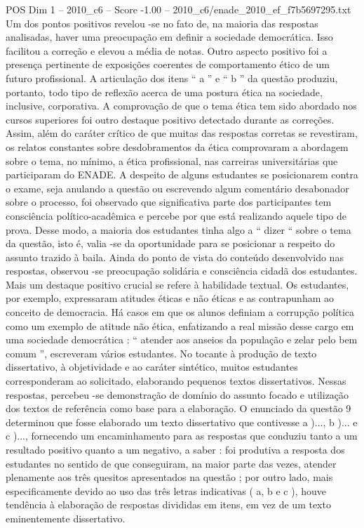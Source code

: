 \begin{textsample}{POS Dim 1 – 2010\_c6 – Score -1.00 – 2010\_c6/enade\_2010\_ef\_f7b5697295.txt}
Um dos pontos positivos revelou -se no fato de, na maioria das respostas analisadas, haver uma preocupação em definir a sociedade democrática.
Isso facilitou a correção e elevou a média de notas.
Outro aspecto positivo foi a presença pertinente de exposições coerentes de comportamento ético de um futuro profissional.
A articulação dos itens “ a ” e “ b ” da questão produziu, portanto, todo tipo de reflexão acerca de uma postura ética na sociedade, inclusive, corporativa.
A comprovação de que o tema ética tem sido abordado nos cursos superiores foi outro destaque positivo detectado durante as correções.
Assim, além do caráter crítico de que muitas das respostas corretas se revestiram, os relatos constantes sobre desdobramentos da ética comprovaram a abordagem sobre o tema, no mínimo, a ética profissional, nas carreiras universitárias que participaram do ENADE.
A despeito de alguns estudantes se posicionarem contra o exame, seja anulando a questão ou escrevendo algum comentário desabonador sobre o processo, foi observado que significativa parte dos participantes tem consciência político-acadêmica e percebe por que está realizando aquele tipo de prova.
Desse modo, a maioria dos estudantes tinha algo a “ dizer “ sobre o tema da questão, isto é, valia -se da oportunidade para se posicionar a respeito do assunto trazido à baila.
Ainda do ponto de vista do conteúdo desenvolvido nas respostas, observou -se preocupação solidária e consciência cidadã dos estudantes.
Mais um destaque positivo crucial se refere à habilidade textual.
Os estudantes, por exemplo, expressaram atitudes éticas e não éticas e as contrapunham ao conceito de democracia.
Há casos em que os alunos definiam a corrupção política como um exemplo de atitude não ética, enfatizando a real missão desse cargo em uma sociedade democrática : “ atender aos anseios da população e zelar pelo bem comum ”, escreveram vários estudantes.
No tocante à produção de texto dissertativo, à objetividade e ao caráter sintético, muitos estudantes corresponderam ao solicitado, elaborando pequenos textos dissertativos.
Nessas respostas, percebeu -se demonstração de domínio do assunto focado e utilização dos textos de referência como base para a elaboração.
O enunciado da questão 9 determinou que fosse elaborado um texto dissertativo que contivesse a )..., b )... e c )..., fornecendo um encaminhamento para as respostas que conduziu tanto a um resultado positivo quanto a um negativo, a saber : foi produtiva a resposta dos estudantes no sentido de que conseguiram, na maior parte das vezes, atender plenamente aos três quesitos apresentados na questão ; por outro lado, mais especificamente devido ao uso das três letras indicativas ( a, b e c ), houve tendência à elaboração de respostas divididas em itens, em vez de um texto eminentemente dissertativo.

\end{textsample}
